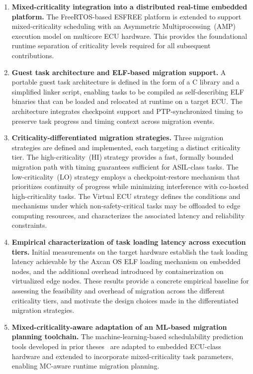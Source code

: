\begin{enumerate}
	
	\item \textbf{Mixed-criticality integration into a distributed real-time embedded
		platform.} The FreeRTOS-based ESFREE platform is extended to support
	mixed-criticality scheduling with an Asymmetric Multiprocessing~(AMP) execution
	model on multicore ECU hardware. This provides the foundational runtime separation
	of criticality levels required for all subsequent contributions.
	
	\item \textbf{Guest task architecture and ELF-based migration support.} A portable
	guest task architecture is defined in the form of a C library and a simplified
	linker script, enabling tasks to be compiled as self-describing ELF binaries that
	can be loaded and relocated at runtime on a target ECU. The architecture integrates
	checkpoint support and PTP-synchronized timing to preserve task progress and timing
	context across migration events.
	
	\item \textbf{Criticality-differentiated migration strategies.} Three migration
	strategies are defined and implemented, each targeting a distinct criticality tier.
	The high-criticality~(HI) strategy provides a fast, formally bounded migration path
	with timing guarantees sufficient for ASIL-class tasks. The low-criticality~(LO)
	strategy employs a checkpoint-restore mechanism that prioritizes continuity of
	progress while minimizing interference with co-hosted high-criticality tasks. The
	Virtual ECU strategy defines the conditions and mechanisms under which
	non-safety-critical tasks may be offloaded to edge computing resources, and
	characterizes the associated latency and reliability constraints.
	
	\item \textbf{Empirical characterization of task loading latency across execution
		tiers.} Initial measurements on the target hardware establish the task loading
	latency achievable by the Axcan OS ELF loading mechanism on embedded nodes, and
	the additional overhead introduced by containerization on virtualized edge nodes.
	These results provide a concrete empirical baseline for assessing the feasibility
	and overhead of migration across the different criticality tiers, and motivate the
	design choices made in the differentiated migration strategies.
	
	\item \textbf{Mixed-criticality-aware adaptation of an ML-based migration planning
		toolchain.} The machine-learning-based schedulability prediction tools developed
	in prior theses~\cite{taieb1,utz1,blieninger1} are adapted to embedded ECU-class
	hardware and extended to incorporate mixed-criticality task parameters, enabling
	MC-aware runtime migration planning.
	
\end{enumerate}

